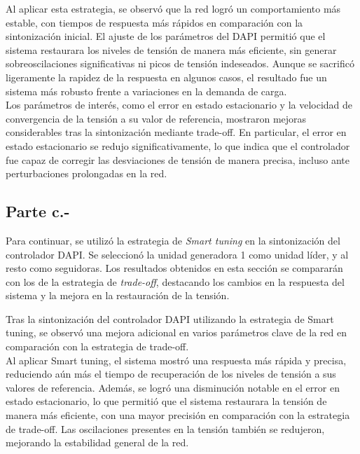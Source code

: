 
Al aplicar esta estrategia, se observó que la red logró un comportamiento más estable, con tiempos de respuesta más rápidos en comparación con la sintonización inicial. El ajuste de los parámetros del DAPI permitió que el sistema restaurara los niveles de tensión de manera más eficiente, sin generar sobreoscilaciones significativas ni picos de tensión indeseados. Aunque se sacrificó ligeramente la rapidez de la respuesta en algunos casos, el resultado fue un sistema más robusto frente a variaciones en la demanda de carga.\\

Los parámetros de interés, como el error en estado estacionario y la velocidad de convergencia de la tensión a su valor de referencia, mostraron mejoras considerables tras la sintonización mediante trade-off. En particular, el error en estado estacionario se redujo significativamente, lo que indica que el controlador fue capaz de corregir las desviaciones de tensión de manera precisa, incluso ante perturbaciones prolongadas en la red.

\subsection{Parte c.-}

Para continuar, se utilizó la estrategia de \textit{Smart tuning} en la sintonización del controlador DAPI. Se seleccionó la unidad generadora 1 como unidad líder, y al resto como seguidoras. Los resultados obtenidos en esta sección se compararán con los de la estrategia de \textit{trade-off}, destacando los cambios en la respuesta del sistema y la mejora en la restauración de la tensión.


Tras la sintonización del controlador DAPI utilizando la estrategia de Smart tuning, se observó una mejora adicional en varios parámetros clave de la red en comparación con la estrategia de trade-off.\\

Al aplicar Smart tuning, el sistema mostró una respuesta más rápida y precisa, reduciendo aún más el tiempo de recuperación de los niveles de tensión a sus valores de referencia. Además, se logró una disminución notable en el error en estado estacionario, lo que permitió que el sistema restaurara la tensión de manera más eficiente, con una mayor precisión en comparación con la estrategia de trade-off. Las oscilaciones presentes en la tensión también se redujeron, mejorando la estabilidad general de la red.\\

